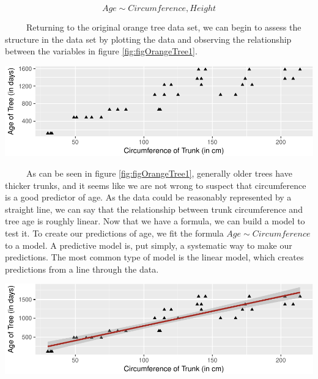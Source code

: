 \documentclass[12pt,twoside]{reedthesis}
\let\origfigure\figure
\let\endorigfigure\endfigure
\renewenvironment{figure}[1][2] {
    \expandafter\origfigure\expandafter[H]
} {
    \endorigfigure
}
\begin{document}
  \[Age \sim Circumference, Height\]
  
  ~~~~~Returning to the original orange tree data set, we can begin to
  assess the structure in the data set by plotting the data and observing
  the relationship between the variables in figure
  \ref{fig:figOrangeTree1}.
  
  \begin{figure}[H]
  
  {\centering \includegraphics{Thesis_files/figure-latex/figOrangeTree1-1} 
  
  }
  
  \caption{The relationship between age and circumference of the trunk of orange trees.}\label{fig:figOrangeTree1}
  \end{figure}
  
  ~~~~~As can be seen in figure \ref{fig:figOrangeTree1}, generally older
  trees have thicker trunks, and it seems like we are not wrong to suspect
  that circumference is a good predictor of age. As the data could be
  reasonably represented by a straight line, we can say that the
  relationship between trunk circumference and tree age is roughly linear.
  Now that we have a formula, we can build a model to test it. To create
  our predictions of age, we fit the formula \(Age \sim Circumference\) to
  a model. A predictive model is, put simply, a systematic way to make our
  predictions. The most common type of model is the linear model, which
  creates predictions from a line through the data.
  
  \begin{figure}[htbp]
  \centering
  \includegraphics{Thesis_files/figure-latex/unnamed-chunk-3-1.pdf}
  \caption{\label{fig:unnamed-chunk-3}\label{fig:OrangeLM}A linear model
  representing age \textasciitilde{} trunk circumference in orange trees.
  The shaded area represents a 95\% confidence interval around this line.}
  \end{figure}
  
\end{document}

